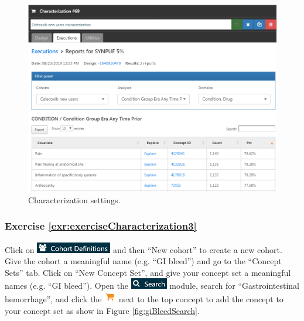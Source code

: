 \documentclass[11pt]{book}
\theoremstyle{definition}
\theoremstyle{definition}
\theoremstyle{definition}
\theoremstyle{remark}
\begin{document}
\begin{figure}

{\centering \includegraphics[width=1\linewidth]{images/SuggestedAnswers/celecoxibCharacterizationResults} 

}

\caption{Characterization settings.}\label{fig:celecoxibCharacterizationResults}
\end{figure}

\subsubsection*{Exercise
\ref{exr:exerciseCharacterization3}}\label{exercise-refexrexercisecharacterization3}

Click on \includegraphics{images/Cohorts/cohortdefinition.png} and then
``New cohort'' to create a new cohort. Give the cohort a meaningful name
(e.g. ``GI bleed'') and go to the ``Concept Sets'' tab. Click on ``New
Concept Set'', and give your concept set a meaningful names (e.g. ``GI
bleed''). Open the \includegraphics{images/Cohorts/search-2.png} module,
search for ``Gastrointestinal hemorrhage'', and click the
\includegraphics{images/Cohorts/shoppingcart.png} next to the top
concept to add the concept to your concept set as show in Figure
\ref{fig:giBleedSearch}.
\end{document}
